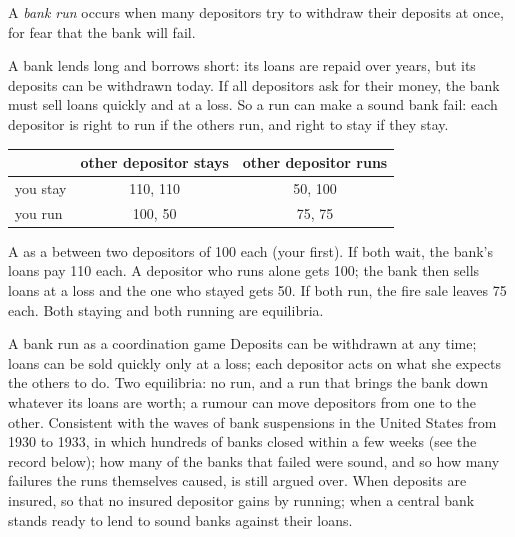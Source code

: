 \begin{definition}\label{def:g11:money-and-banking:bank-run}
A \emph{bank run} occurs when many depositors try to withdraw their deposits at once, for fear that the bank will fail.
\end{definition}

A bank lends long and borrows short: its loans are repaid over years, but its deposits can be withdrawn today. If all depositors ask for their money, the bank must sell
loans quickly and at a loss. So a run can make a sound bank fail: each depositor is right to run if the others run, and right to stay if they stay.

\begin{omfigure}
\renewcommand{\arraystretch}{1.3}
\begin{tabular}{lcc}
\toprule
 & other depositor stays & other depositor runs \\
\midrule
you stay & 110, 110 & 50, 100 \\
you run & 100, 50 & 75, 75 \\
\bottomrule
\end{tabular}

{\small A  as a  between two depositors of 100 each (your  first). If both wait, the bank's loans pay 110 each. A depositor who runs alone gets 100; the
bank then sells loans at a loss and the one who stayed gets 50. If both run, the fire sale leaves 75 each. Both staying and both running are equilibria.}
\end{omfigure}

\begin{model}{A bank run as a coordination game}
\assumes Deposits can be withdrawn at any time; loans can be sold quickly only at a loss; each depositor acts on what she expects the others to do.
\predicts Two equilibria: no run, and a run that brings the bank down whatever its loans are worth; a rumour can move depositors from one to the other.
\tested Consistent with the waves of bank suspensions in the United States from 1930 to 1933, in which hundreds of banks closed within a few weeks
  (see the record below); how many of the banks that failed were sound, and so how many failures the runs themselves caused, is still argued over.
\breaks When deposits are insured, so that no insured depositor gains by running; when a central bank stands ready to lend to sound banks against their loans.
\end{model}

